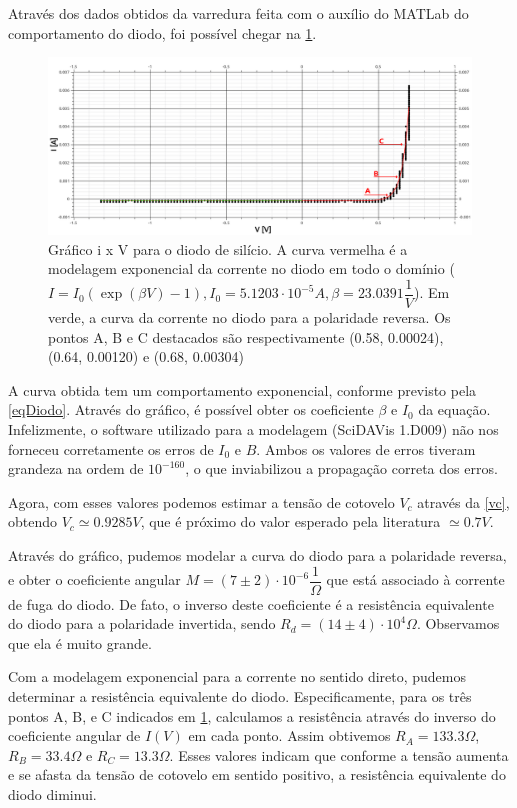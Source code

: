 \documentclass[11pt,a4paper]{article}
\begin{document}
    Através dos dados obtidos da varredura feita com o auxílio do MATLab do comportamento do diodo, foi possível chegar na \cref{Grafico}.

        \begin{figure}[!htb]
        \centering
        \includegraphics[scale=0.4]{Grafico.png}
        \caption{Gráfico i x V para o diodo de silício. A curva vermelha é a modelagem exponencial da corrente no diodo em todo o domínio ($I = I_0 (\exp(\beta V) - 1), I_0 = 5.1203\cdot10^{-5} A, \beta = 23.0391 \dfrac{1}{V}$). Em verde, a curva da corrente no diodo para a polaridade reversa. Os pontos A, B e C destacados são respectivamente (0.58, 0.00024), (0.64, 0.00120) e (0.68, 0.00304)}
        \label{Grafico}
        \end{figure}
        
    
    A curva obtida tem um comportamento exponencial, conforme previsto pela \cref{eqDiodo}. Através do gráfico, é possível obter os coeficiente $\beta$ e $I_0$ da equação. Infelizmente, o software utilizado para a modelagem (SciDAVis 1.D009) não nos forneceu corretamente os erros de $I_0$ e $B$. Ambos os valores de erros tiveram grandeza na ordem de $10^{-160}$, o que inviabilizou a propagação correta dos erros.
    
    Agora, com esses valores podemos estimar a tensão de cotovelo $V_c$ através da \cref{vc}, obtendo $V_c \simeq 0.9285 V$, que é próximo do valor esperado pela literatura $\simeq 0.7V$.
    
    Através do gráfico, pudemos modelar a curva do diodo para a polaridade reversa, e obter o coeficiente angular $M = (7 \pm 2)\cdot10^{-6}\dfrac{1}{\Omega}$ que está associado à corrente de fuga do diodo. De fato, o inverso deste coeficiente é a resistência equivalente do diodo para a polaridade invertida, sendo $R_d = (14 \pm 4)\cdot10^{4}\Omega$. Observamos que ela é muito grande.
    
    Com a modelagem exponencial para a corrente no sentido direto, pudemos determinar a resistência equivalente do diodo. Especificamente, para os três pontos A, B, e C indicados em \cref{Grafico}, calculamos a resistência através do inverso do coeficiente angular de $I(V)$ em cada ponto. Assim obtivemos $R_A = 133.3\Omega$, $R_B = 33.4\Omega$ e $R_C = 13.3\Omega$. Esses valores indicam que conforme a tensão aumenta e se afasta da tensão de cotovelo em sentido positivo, a resistência equivalente do diodo diminui.
    
\end{document}
